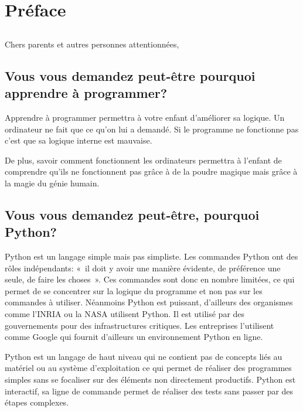 



\markboth{}{}

\chapter{Préface}
\section*{}

Chers parents et autres personnes attentionnées,\\

\section*{Vous vous demandez peut-être pourquoi apprendre à programmer?}
Apprendre à programmer permettra à votre enfant d'améliorer sa logique. Un ordinateur ne fait que ce qu'on lui a demandé. Si le programme ne fonctionne pas c'est que sa logique interne est mauvaise. 

De plus, savoir comment fonctionnent les ordinateurs permettra à l'enfant de compren\-dre qu'ils ne fonctionnent pas grâce à de la poudre magique mais grâce à la magie du génie humain.


\section*{Vous vous demandez peut-être, pourquoi Python?}
Python est un langage simple mais pas simpliste. Les commandes Python ont des rôles indépendants: « il doit y avoir une manière évidente, de préférence une seule, de faire les choses ». Ces commandes sont donc en nombre limitées, ce qui permet de se concentrer sur la logique du programme et non pas sur les commandes à utiliser. 
Néanmoins Python est puissant, d'ailleurs des organismes comme l'INRIA ou la NASA utilisent Python. Il est utilisé par des gouvernements pour des infrastructures critiques. Les entreprises l'utilisent comme Google qui fournit d'ailleurs un environnement Python en ligne.

Python est un langage de haut niveau qui ne contient pas de concepts liés au matériel ou au système d'exploitation ce qui permet de réaliser des programmes simples sans se focaliser sur des éléments non directement productifs. Python est interactif, sa ligne de commande permet de réaliser des tests sans passer par des étapes complexes.

